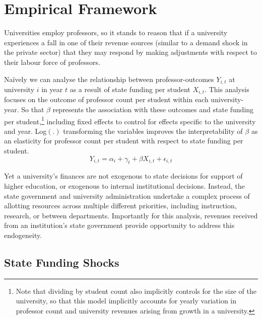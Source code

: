 \section{Empirical Framework}
\label{sec:empirics}

Universities employ professors, so it stands to reason that if a university experiences a fall in one of their revenue sources (similar to a demand shock in the private sector) that they may respond by making adjustments with respect to their labour force of professors.

Na\"ively we can analyse the relationship between professor-outcomes $Y_{i,t}$ at university $i$ in year $t$ as a result of state funding per student $X_{i,t}$.
This analysis focuses on the outcome of professor count per student within each university-year.
So that $\beta$ represents the association with these outcomes and state funding per student,\footnote{
    Note that dividing by student count also implicitly controls for the size of the university, so that this model implicitly accounts for yearly variation in professor count and university revenues arising from growth in a university.
}
including fixed effects to control for effects specific to the university and year.
Log$(.)$ transforming the variables improves the interpretability of $\beta$ as an elasticity for professor count per student with respect to state funding per student.
\begin{equation}
    \label{eqn:naivereg}
    Y_{i,t} = \alpha_i + \gamma_t + \beta X_{i,t} + \epsilon_{i,t}
\end{equation}

Yet a university's finances are not exogenous to state decisions for support of higher education, or exogenous to internal institutional decisions.
Instead, the state government and university administration undertake a complex process of allotting resources across multiple different priorities, including instruction, research, or between departments.
Importantly for this analysis, revenues received from an institution's state government provide opportunity to address this endogeneity.


\subsection{State Funding Shocks}
\label{sec:approp-shocks}

